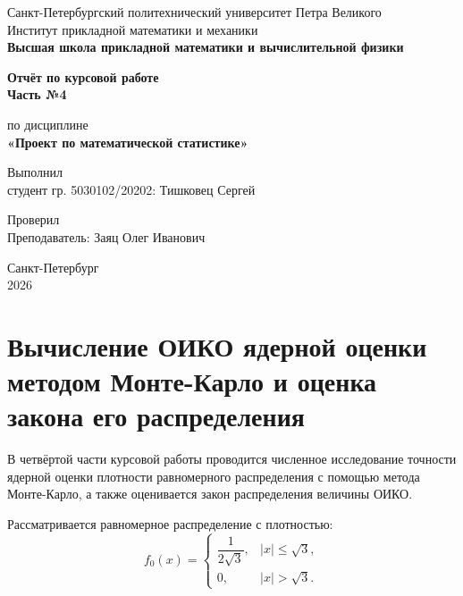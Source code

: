 \documentclass[12pt,a4paper]{article}
\begin{document}

\begin{titlepage}
  \begin{center}
    {Санкт-Петербургский политехнический университет Петра Великого\\
    Институт прикладной математики и механики\\[0.5em]
    \textbf{Высшая школа прикладной математики и вычислительной физики}}
  
    \vfill
  
    {\LARGE\bfseries Отчёт по курсовой работе\\ Часть №4\par}
    \vspace{1em}
    {\Large по дисциплине\\[0.3em] {\bfseries «Проект по математической статистике»}}
  
    \vfill
  
    \begin{flushright}
        Выполнил\\
        студент гр. 5030102/20202: Тишковец Сергей
    \end{flushright}
  
    \begin{flushright}
        Проверил\\
        Преподаватель: Заяц Олег Иванович
    \end{flushright}
  
    \vfill
    Санкт-Петербург\\
    2026
  \end{center}
\end{titlepage}

\setcounter{page}{2}
\newpage

\section*{Вычисление ОИКО ядерной оценки методом Монте-Карло и оценка закона его распределения}

В четвёртой части курсовой работы проводится численное исследование точности ядерной оценки плотности равномерного распределения с помощью метода Монте-Карло, а также оценивается закон распределения величины ОИКО.

Рассматривается равномерное распределение с плотностью:
\[
f_0(x) = 
\begin{cases}
\dfrac{1}{2\sqrt{3}}, & |x| \le \sqrt{3}, \\
0, & |x| > \sqrt{3}.
\end{cases}
\]
\end{document}
